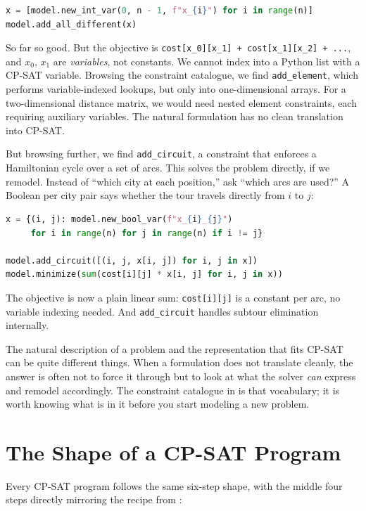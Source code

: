 \begin{lstlisting}[language=Python]
x = [model.new_int_var(0, n - 1, f"x_{i}") for i in range(n)]
model.add_all_different(x)
\end{lstlisting}

So far so good. But the objective is
\lstinline!cost[x_0][x_1] + cost[x_1][x_2] + ...!,
and \(x_0\), \(x_1\) are \emph{variables}, not constants. We cannot
index into a Python list with a CP-SAT variable. Browsing the constraint
catalogue, we find \lstinline!add_element!, which
performs variable-indexed lookups, but only into one-dimensional
arrays. For a two-dimensional distance matrix, we would need nested
element constraints, each requiring auxiliary variables. The natural
formulation has no clean translation into CP-SAT.

But browsing further, we find \lstinline!add_circuit!,
a constraint that enforces a Hamiltonian cycle over a set of arcs. This
solves the problem directly, if we remodel. Instead of ``which city at
each position,'' ask ``which arcs are used?'' A Boolean per city pair
says whether the tour travels directly from \(i\) to \(j\):

\begin{lstlisting}[language=Python]
x = {(i, j): model.new_bool_var(f"x_{i}_{j}")
     for i in range(n) for j in range(n) if i != j}

model.add_circuit([(i, j, x[i, j]) for i, j in x])
model.minimize(sum(cost[i][j] * x[i, j] for i, j in x))
\end{lstlisting}

The objective is now a plain linear sum:
\lstinline!cost[i][j]! is a constant per arc, no variable
indexing needed. And \lstinline!add_circuit! handles
subtour elimination internally.

The natural description of a problem and the representation that fits
CP-SAT can be quite different things. When a formulation does not
translate cleanly, the answer is often not to force it through but to
look at what the solver \emph{can} express and remodel accordingly. The
constraint catalogue in  is that vocabulary; it is worth
knowing what is in it before you start modeling a new problem.

\section{The Shape of a CP-SAT Program}\label{sec:5.6}

Every CP-SAT program follows the same six-step shape, with the middle
four steps directly mirroring the recipe from :


